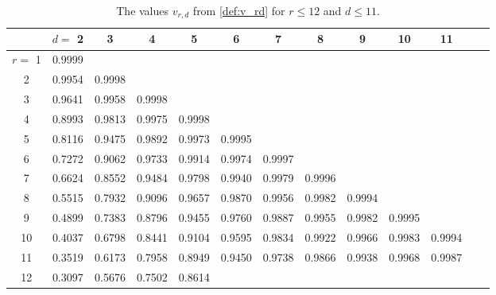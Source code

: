 \documentclass[11pt]{article}
\theoremstyle{definition}
\begin{document}
\begin{table}[h!]
\centering
{\footnotesize
\begin{tabular}{ ccccccccccccc}
 & $d=$ 2 & 3 & 4 & 5 & 6 & 7 & 8 & 9 & 10 & 11 \\
 \hline
$r =$ 1 & 0.9999 \\
2 & 0.9954 & 0.9998 \\
3 & 0.9641 & 0.9958 & 0.9998 \\
4 & 0.8993 & 0.9813 & 0.9975 & 0.9998 \\
5 & 0.8116 & 0.9475 & 0.9892 & 0.9973 & 0.9995 \\
6 & 0.7272 & 0.9062 & 0.9733 & 0.9914 & 0.9974 & 0.9997 \\
7 & 0.6624 & 0.8552 & 0.9484 & 0.9798 & 0.9940 & 0.9979 & 0.9996 \\
8 & 0.5515 & 0.7932 & 0.9096 & 0.9657 & 0.9870 & 0.9956 & 0.9982 & 0.9994 \\
9 & 0.4899 & 0.7383 & 0.8796 & 0.9455 & 0.9760 & 0.9887 & 0.9955 & 0.9982 & 0.9995 \\
10 & 0.4037 & 0.6798 & 0.8441 & 0.9104 & 0.9595 & 0.9834 & 0.9922 & 0.9966 & 0.9983 & 0.9994 \\
11 & 0.3519 & 0.6173 & 0.7958 & 0.8949 & 0.9450 & 0.9738 & 0.9866 & 0.9938 & 0.9968 & 0.9987  \\
12 & 0.3097 & 0.5676 & 0.7502 & 0.8614 \\
\hline
\end{tabular}
}
\caption{The values $v_{r,d}$ from \eqref{def:v_rd} for $r \le 12$ and  $d \le 11$. \label{tab:vrd}}
\end{table}
\end{document}
